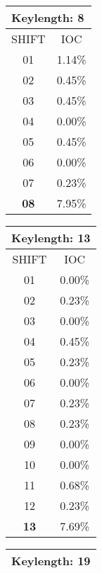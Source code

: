 \begin{table}[h]
    \begin{subtable}[t]{0.3\textwidth}
        \centering
        \begin{tabular}{c|c}
            \multicolumn{2}{l}{\textbf{Keylength: 8}}\\\hline
            SHIFT & IOC\\\hline
            01&      1.14\%\\
            02&      0.45\%\\
            03&      0.45\%\\
            04&      0.00\%\\
            05&      0.45\%\\
            06&      0.00\%\\
            07&      0.23\%\\
            \textbf{08}&      7.95\%
        \end{tabular}
    \end{subtable}
    \begin{subtable}[h]{0.3\textwidth}
        \centering
        \begin{tabular}{c|c}
            \multicolumn{2}{l}{\textbf{Keylength: 13}}\\\hline
            SHIFT & IOC\\\hline
            01 &      0.00\%\\
            02 &      0.23\%\\
            03 &      0.00\%\\
            04 &      0.45\%\\
            05 &      0.23\%\\
            06 &      0.00\%\\
            07 &      0.23\%\\
            08 &      0.23\%\\
            09 &      0.00\%\\
            10 &      0.00\%\\
            11 &      0.68\%\\
            12 &      0.23\%\\
            \textbf{13} &      7.69\%
        \end{tabular}
    \end{subtable}
    \begin{subtable}[h]{0.3\textwidth}
        \centering
        \begin{tabular}{c|c}
            \multicolumn{2}{l}{\textbf{Keylength: 19}}\\\hline

\end{tabular}
\end{subtable}
\end{table}
